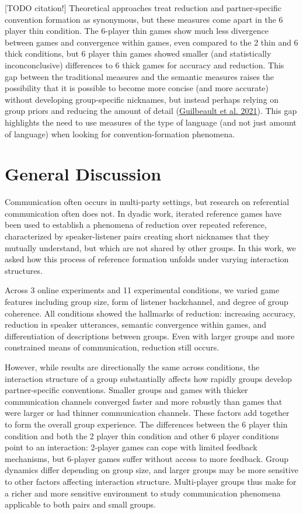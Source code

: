 \documentclass[
  english,
  a4paper,
]{article}
\begin{document}
{[}TODO citation!{]} Theoretical approaches treat reduction and partner-specific convention formation as synonymous, but these measures come apart in the 6 player thin condition. The 6-player thin games show much less divergence between games and convergence within games, even compared to the 2 thin and 6 thick conditions, but 6 player thin games showed smaller (and statistically inconconclusive) differences to 6 thick games for accuracy and reduction. This gap between the traditional measures and the semantic measures raises the possibility that it is possible to become more concise (and more accurate) without developing group-specific nicknames, but instead perhaps relying on group priors and reducing the amount of detail (\protect\hyperlink{ref-guilbeault2021}{Guilbeault et al. 2021}). This gap highlights the need to use measures of the type of language (and not just amount of language) when looking for convention-formation phenomena.

\hypertarget{general-discussion}{%
\section{General Discussion}\label{general-discussion}}

Communication often occurs in multi-party settings, but research on referential communication often does not. In dyadic work, iterated reference games have been used to establish a phenomena of reduction over repeated reference, characterized by speaker-listener pairs creating short nicknames that they mutually understand, but which are not shared by other groups. In this work, we asked how this process of reference formation unfolds under varying interaction structures.

Across 3 online experiments and 11 experimental conditions, we varied game features including group size, form of listener backchannel, and degree of group coherence. All conditions showed the hallmarks of reduction: increasing accuracy, reduction in speaker utterances, semantic convergence within games, and differentiation of descriptions between groups. Even with larger groups and more constrained means of communication, reduction still occurs.

However, while results are directionally the same across conditions, the interaction structure of a group substantially affects how rapidly groups develop partner-specific conventions. Smaller groups and games with thicker communication channels converged faster and more robustly than games that were larger or had thinner communication channels. These factors add together to form the overall group experience. The differences between the 6 player thin condition and both the 2 player thin condition and other 6 player conditions point to an interaction: 2-player games can cope with limited feedback mechanisms, but 6-player games suffer without access to more feedback. Group dynamics differ depending on group size, and larger groups may be more sensitive to other factors affecting interaction structure. Multi-player groups thus make for a richer and more sensitive environment to study communication phenomena applicable to both pairs and small groups.
\end{document}

